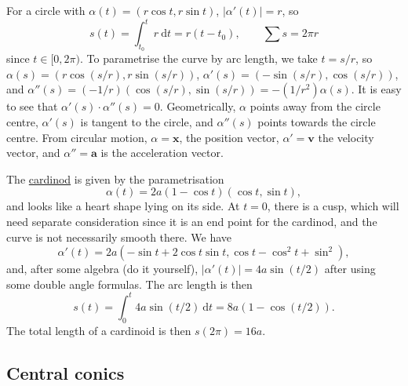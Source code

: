 \documentclass[10pt,notitlepage]{revtex4-1}
\newenvironment{example}[1][Example]{\begin{trivlist}
\item[\hskip \labelsep {\bfseries #1}]}{\end{trivlist}}
\newcommand{\xb}{\boldsymbol{x}}
\newcommand{\vb}{\boldsymbol{v}}
\newcommand{\ab}{{\boldsymbol{a}}}
\begin{document}
\begin{example}
	For a circle with $\alpha(t)=(r\cos t, r\sin t)$, $|\alpha'(t)|=r$, so
	\begin{equation}
		s(t)=\int_{t_0}^t r\ \mathrm{d}t = r(t-t_0),\qquad
		\sum s = 2\pi r
	\end{equation}
	since $t\in[0,2\pi)$. To parametrise the curve by arc length, we take
	$t=s/r$, so $\alpha(s)=(r\cos (s/r), r\sin(s/r))$, $\alpha'(s)=(-\sin (s/r),
	\cos(s/r))$, and $\alpha''(s)=(-1/r)(\cos(s/r),
	\sin(s/r))=-(1/r^2)\alpha(s)$. It is easy to see that
	$\alpha'(s)\cdot\alpha''(s)=0$. Geometrically, $\alpha$ points away from the
	circle centre, $\alpha'(s)$ is tangent to the circle, and $\alpha''(s)$
	points towards the circle centre. From circular motion, $\alpha=\xb$, the
	position vector, $\alpha'=\vb$ the velocity vector, and $\alpha''=\ab$ is
	the acceleration vector.
\end{example}

\begin{example}
	The \underline{cardinod} is given by the parametrisation
	\begin{equation}
		\alpha(t)=2a(1-\cos t)(\cos t, \sin t),
	\end{equation}
	and looks like a heart shape lying on its side. At $t=0$, there is a cusp,
	which will need separate consideration since it is an end point for the
	cardinod, and the curve is not necessarily smooth there. We have
	\begin{equation}
		\alpha'(t)=2a(-\sin t+2\cos t\sin t, \cos t-\cos^2 t + \sin^2),
	\end{equation}
	and, after some algebra (do it yourself), $|\alpha'(t)|=4a\sin (t/2)$ after
	using some double angle formulas. The arc length is then
	\begin{equation}
		s(t)=\int_0^t 4a\sin(t/2)\ \mathrm{d}t=8a(1-\cos(t/2)).
	\end{equation}
	The total length of a cardinoid is then	$s(2\pi)=16a$.
\end{example}


\subsection{Central conics}
\end{document}
